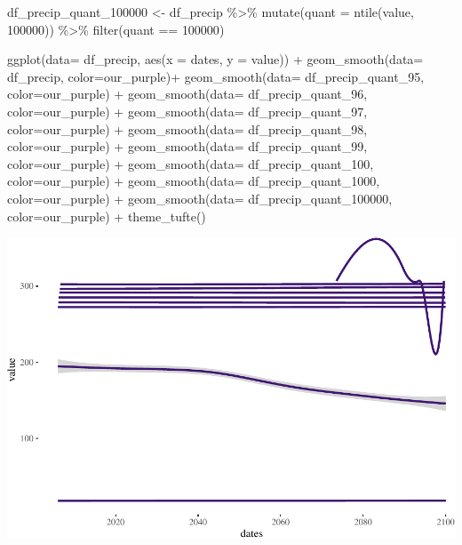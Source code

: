 \documentclass[
  paper=a4,
  ,captions=tableheading
]{scrartcl}
\newenvironment{Shaded}{\begin{snugshade}}{\end{snugshade}}
\newcommand{\AttributeTok}[1]{\textcolor[rgb]{0.77,0.63,0.00}{#1}}
\newcommand{\DecValTok}[1]{\textcolor[rgb]{0.00,0.00,0.81}{#1}}
\newcommand{\FunctionTok}[1]{\textcolor[rgb]{0.00,0.00,0.00}{#1}}
\newcommand{\NormalTok}[1]{#1}
\newcommand{\OtherTok}[1]{\textcolor[rgb]{0.56,0.35,0.01}{#1}}
\newcommand{\SpecialCharTok}[1]{\textcolor[rgb]{0.00,0.00,0.00}{#1}}
\begin{document}
\begin{Shaded}
\begin{Highlighting}[]
\NormalTok{df\_precip\_quant\_100000 }\OtherTok{\textless{}{-}}\NormalTok{ df\_precip }\SpecialCharTok{\%\textgreater{}\%} 
  \FunctionTok{mutate}\NormalTok{(}\AttributeTok{quant =} \FunctionTok{ntile}\NormalTok{(value, }\DecValTok{100000}\NormalTok{)) }\SpecialCharTok{\%\textgreater{}\%}
  \FunctionTok{filter}\NormalTok{(quant }\SpecialCharTok{==} \DecValTok{100000}\NormalTok{)}
\end{Highlighting}
\end{Shaded}

\begin{Shaded}
\begin{Highlighting}[]
\FunctionTok{ggplot}\NormalTok{(}\AttributeTok{data=}\NormalTok{ df\_precip, }\FunctionTok{aes}\NormalTok{(}\AttributeTok{x =}\NormalTok{ dates, }\AttributeTok{y =}\NormalTok{ value)) }\SpecialCharTok{+} 
     \FunctionTok{geom\_smooth}\NormalTok{(}\AttributeTok{data=}\NormalTok{ df\_precip, }\AttributeTok{color=}\NormalTok{our\_purple)}\SpecialCharTok{+} 
     \FunctionTok{geom\_smooth}\NormalTok{(}\AttributeTok{data=}\NormalTok{ df\_precip\_quant\_95, }\AttributeTok{color=}\NormalTok{our\_purple) }\SpecialCharTok{+}
    \FunctionTok{geom\_smooth}\NormalTok{(}\AttributeTok{data=}\NormalTok{ df\_precip\_quant\_96, }\AttributeTok{color=}\NormalTok{our\_purple) }\SpecialCharTok{+}
    \FunctionTok{geom\_smooth}\NormalTok{(}\AttributeTok{data=}\NormalTok{ df\_precip\_quant\_97, }\AttributeTok{color=}\NormalTok{our\_purple) }\SpecialCharTok{+}
    \FunctionTok{geom\_smooth}\NormalTok{(}\AttributeTok{data=}\NormalTok{ df\_precip\_quant\_98, }\AttributeTok{color=}\NormalTok{our\_purple) }\SpecialCharTok{+}
    \FunctionTok{geom\_smooth}\NormalTok{(}\AttributeTok{data=}\NormalTok{ df\_precip\_quant\_99, }\AttributeTok{color=}\NormalTok{our\_purple) }\SpecialCharTok{+}
  \FunctionTok{geom\_smooth}\NormalTok{(}\AttributeTok{data=}\NormalTok{ df\_precip\_quant\_100, }\AttributeTok{color=}\NormalTok{our\_purple) }\SpecialCharTok{+}
  \FunctionTok{geom\_smooth}\NormalTok{(}\AttributeTok{data=}\NormalTok{ df\_precip\_quant\_1000, }\AttributeTok{color=}\NormalTok{our\_purple) }\SpecialCharTok{+}
    \FunctionTok{geom\_smooth}\NormalTok{(}\AttributeTok{data=}\NormalTok{ df\_precip\_quant\_100000, }\AttributeTok{color=}\NormalTok{our\_purple) }\SpecialCharTok{+}
  \FunctionTok{theme\_tufte}\NormalTok{()}
\end{Highlighting}
\end{Shaded}

\includegraphics{Haskell_files/figure-latex/unnamed-chunk-95-1.pdf}
\end{document}
